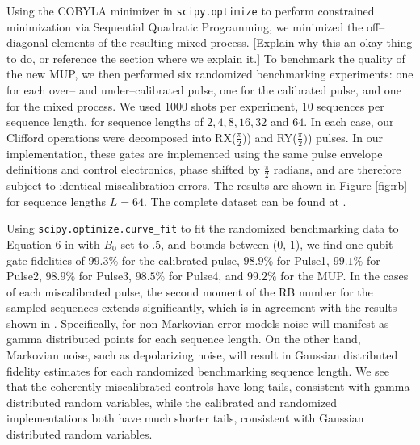 \documentclass[aps,nofootinbib,pra,notitlepage,twocolumn]{revtex4-1}
\newcommand{\note}[1]{{\color{red}[#1]}}
\begin{document}
Using the COBYLA minimizer in \texttt{scipy.optimize}\cite{scipy} to perform constrained minimization via Sequential Quadratic Programming\cite{wright1999numerical}, we minimized the off--diagonal elements of the resulting mixed process. \note{Explain why this an okay thing to do, or reference the section where we explain it.} To benchmark the quality of the new MUP, we then performed six randomized benchmarking experiments\cite{Magesan2011}: one for each over-- and under--calibrated pulse, one for the calibrated pulse, and one for the mixed process. We used $1000$ shots per experiment, $10$ sequences per sequence length, for sequence lengths of $2, 4, 8, 16, 32$ and $64$. In each case, our Clifford operations were decomposed into RX($\frac{\pi}{2})$) and RY($\frac{\pi}{2})$) pulses. In our implementation, these gates are implemented using the same pulse envelope definitions and control electronics, phase shifted by $\frac{\pi}{2}$ radians, and are therefore subject to identical miscalibration errors. The results are shown in Figure \ref{fig:rb} for sequence lengths $L=64$. The complete dataset can be found at  \cite{decorrelating_errors}.

Using \texttt{scipy.optimize.curve\_fit} to fit the randomized benchmarking data to Equation 6 in \cite{Magesan2011} with $B_0$ set to .5, and bounds between (0, 1), we find one-qubit gate fidelities of $99.3\%$ for the calibrated pulse, $98.9\%$ for Pulse1, $99.1\%$ for Pulse2, $98.9\%$ for Pulse3, $98.5\%$ for Pulse4, and $99.2\%$ for the MUP. In the cases of each miscalibrated pulse, the second moment of the RB number\cite{Proctor2017} for the sampled sequences extends significantly, which is in agreement with the results shown in \cite{Ball2016}. Specifically, for non-Markovian error models noise will manifest as gamma distributed points for each sequence length. On the other hand, Markovian noise, such as depolarizing noise, will result in Gaussian distributed fidelity estimates for each randomized benchmarking sequence length. We see that the coherently miscalibrated controls have long tails, consistent with gamma distributed random variables, while the calibrated and randomized implementations both have much shorter tails, consistent with Gaussian distributed random variables. 
\end{document}

